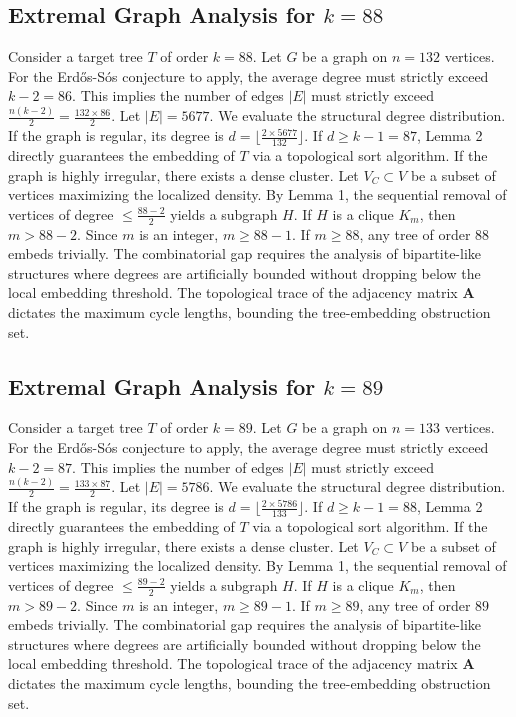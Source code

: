 \documentclass[11pt,a4paper]{article}
\begin{document}
\subsection{Extremal Graph Analysis for $k=88$}
Consider a target tree $T$ of order $k=88$.
Let $G$ be a graph on $n=132$ vertices.
For the Erd\H{o}s-S\'os conjecture to apply, the average degree must strictly exceed $k-2 = 86$.
This implies the number of edges $|E|$ must strictly exceed $\frac{n(k-2)}{2} = \frac{132 \times 86}{2}$.
Let $|E| = 5677$.
We evaluate the structural degree distribution. If the graph is regular, its degree is $d = \lfloor \frac{2 \times 5677}{132} \rfloor$.
If $d \geq k-1 = 87$, Lemma 2 directly guarantees the embedding of $T$ via a topological sort algorithm.
If the graph is highly irregular, there exists a dense cluster. Let $V_C \subset V$ be a subset of vertices maximizing the localized density.
By Lemma 1, the sequential removal of vertices of degree $\leq \frac{88-2}{2}$ yields a subgraph $H$.
If $H$ is a clique $K_{m}$, then $m > 88-2$. Since $m$ is an integer, $m \geq 88-1$. If $m \geq 88$, any tree of order $88$ embeds trivially.
The combinatorial gap requires the analysis of bipartite-like structures where degrees are artificially bounded without dropping below the local embedding threshold. The topological trace of the adjacency matrix $\mathbf{A}$ dictates the maximum cycle lengths, bounding the tree-embedding obstruction set.


\subsection{Extremal Graph Analysis for $k=89$}
Consider a target tree $T$ of order $k=89$.
Let $G$ be a graph on $n=133$ vertices.
For the Erd\H{o}s-S\'os conjecture to apply, the average degree must strictly exceed $k-2 = 87$.
This implies the number of edges $|E|$ must strictly exceed $\frac{n(k-2)}{2} = \frac{133 \times 87}{2}$.
Let $|E| = 5786$.
We evaluate the structural degree distribution. If the graph is regular, its degree is $d = \lfloor \frac{2 \times 5786}{133} \rfloor$.
If $d \geq k-1 = 88$, Lemma 2 directly guarantees the embedding of $T$ via a topological sort algorithm.
If the graph is highly irregular, there exists a dense cluster. Let $V_C \subset V$ be a subset of vertices maximizing the localized density.
By Lemma 1, the sequential removal of vertices of degree $\leq \frac{89-2}{2}$ yields a subgraph $H$.
If $H$ is a clique $K_{m}$, then $m > 89-2$. Since $m$ is an integer, $m \geq 89-1$. If $m \geq 89$, any tree of order $89$ embeds trivially.
The combinatorial gap requires the analysis of bipartite-like structures where degrees are artificially bounded without dropping below the local embedding threshold. The topological trace of the adjacency matrix $\mathbf{A}$ dictates the maximum cycle lengths, bounding the tree-embedding obstruction set.
\end{document}
